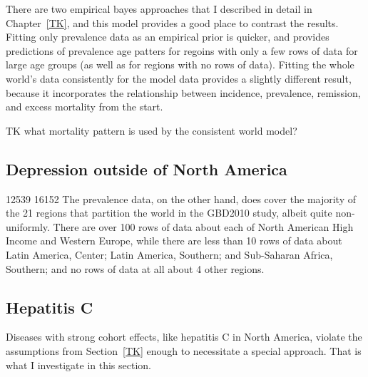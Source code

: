 There are two empirical bayes approaches that I described in detail in
Chapter~\ref{TK}, and this model provides a good place to contrast the
results.  Fitting only prevalence data as an empirical prior is
quicker, and provides predictions of prevalence age patters for
regoins with only a few rows of data for large age groups (as well as
for regions with no rows of data).  Fitting the whole world's data
consistently for the model data provides a slightly different result,
because it incorporates the relationship between incidence,
prevalence, remission, and excess mortality from the start.

TK what mortality pattern is used by the consistent world model?

\subsection{Depression outside of North America}
12539 
16152
 The prevalence data, on the
other hand, does cover the majority of the 21 regions that partition
the world in the GBD2010 study, albeit quite non-uniformly.  There are
over 100 rows of data about each of North American High Income and
Western Europe, while there are less than 10 rows of data about Latin
America, Center; Latin America, Southern; and Sub-Saharan Africa,
Southern; and no rows of data at all about 4 other regions.

\subsection{Hepatitis C}
Diseases with strong cohort effects, like hepatitis C in North America,
violate the assumptions from Section~\ref{TK} enough to
necessitate a special approach.  That is what I investigate in this
section.

